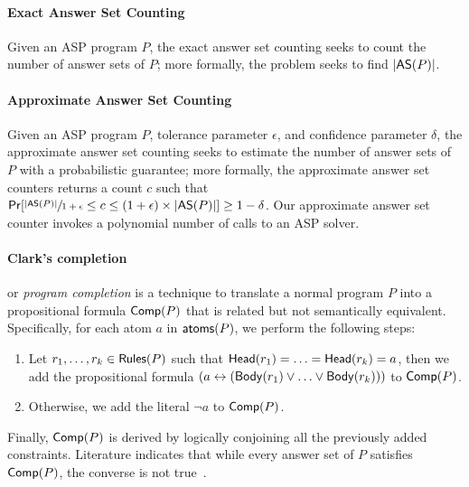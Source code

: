 \paragraph{Exact Answer Set Counting~\cite{KCM2024}}
Given an ASP program $P$, the exact answer set counting seeks to count the number of answer sets of $P$; more formally, the problem seeks to find $|\mathsf{AS}(P)|$.

\paragraph{Approximate Answer Set Counting~\cite{KESHFM2022}}
Given an ASP program $P$, tolerance parameter $\epsilon$, and confidence parameter $\delta$, the approximate answer set counting seeks to estimate the number of answer sets of $P$ with a probabilistic guarantee; more formally, the approximate answer set counters returns a count $c$ such that 
$\mathsf{Pr}[\sfrac{|\mathsf{AS}(P)|}{1 + \epsilon} \leq c \leq (1 + \epsilon) \times |\mathsf{AS}(P)|] \geq 1 - \delta$. Our approximate answer set counter invokes a polynomial number of calls to an ASP solver. 

\paragraph{Clark's completion} \cite{clark1978} or \emph{program
completion} is a technique to translate a normal program $P$ into a propositional formula $\mathsf{Comp}(P)$ that is related but not semantically equivalent. Specifically, for each atom $a$ in $\mathsf{atoms}(P)$, we perform the following steps:
\begin{enumerate}
    \item Let $r_1, \ldots, r_k \in \mathsf{Rules}(P)$ such
      that $\mathsf{Head}(r_1) =\ldots= \mathsf{Head}(r_k) = a$, then we add the
      propositional formula $(a \leftrightarrow (\mathsf{Body}(r_1) \vee
      \ldots \vee \mathsf{Body}(r_k)))$ to $\mathsf{Comp}(P)$.
    \item Otherwise, we add the literal $\neg{a}$ to $\mathsf{Comp}(P)$.
\end{enumerate}
Finally, $\mathsf{Comp}(P)$ is derived by logically conjoining all the previously added constraints. Literature indicates that while every answer set of $P$ satisfies $\mathsf{Comp}(P)$, the converse is not true~\cite{LZ2004}.